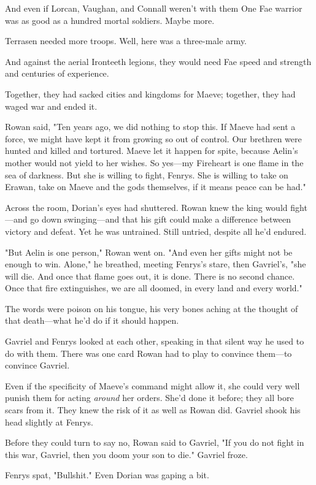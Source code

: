 And even if Lorcan, Vaughan, and Connall weren't with them  One Fae warrior was as good as a hundred mortal soldiers. Maybe more.

Terrasen needed more troops. Well, here was a three-male army.

And against the aerial Ironteeth legions, they would need Fae speed and strength and centuries of experience.

Together, they had sacked cities and kingdoms for Maeve; together, they had waged war and ended it.

Rowan said, "Ten years ago, we did nothing to stop this. If Maeve had sent a force, we might have kept it from growing so out of control. Our brethren were hunted and killed and tortured. Maeve let it happen for spite, because Aelin's mother would not yield to her wishes. So yes---my Fireheart is one flame in the sea of darkness. But she is willing to fight, Fenrys. She is willing to take on Erawan, take on Maeve and the gods themselves, if it means peace can be had."

Across the room, Dorian's eyes had shuttered. Rowan knew the king would fight---and go down swinging---and that his gift could make a difference between victory and defeat. Yet  he was untrained. Still untried, despite all he'd endured.

"But Aelin is one person," Rowan went on. "And even her gifts might not be enough to win. Alone," he breathed, meeting Fenrys's stare, then Gavriel's, "she will die. And once that flame goes out, it is done. There is no second chance. Once that fire extinguishes, we are all doomed, in every land and every world."

The words were poison on his tongue, his very bones aching at the thought of that death---what he'd do if it should happen.

Gavriel and Fenrys looked at each other, speaking in that silent way he used to do with them. There was one card Rowan had to play to convince them---to convince Gavriel.

Even if the specificity of Maeve's command might allow it, she could very well punish them for acting \emph{around} her orders. She'd done it before; they all bore scars from it. They knew the risk of it as well as Rowan did. Gavriel shook his head slightly at Fenrys.

Before they could turn to say no, Rowan said to Gavriel, "If you do not fight in this war, Gavriel, then you doom your son to die." Gavriel froze.

Fenrys spat, "Bullshit." Even Dorian was gaping a bit.

